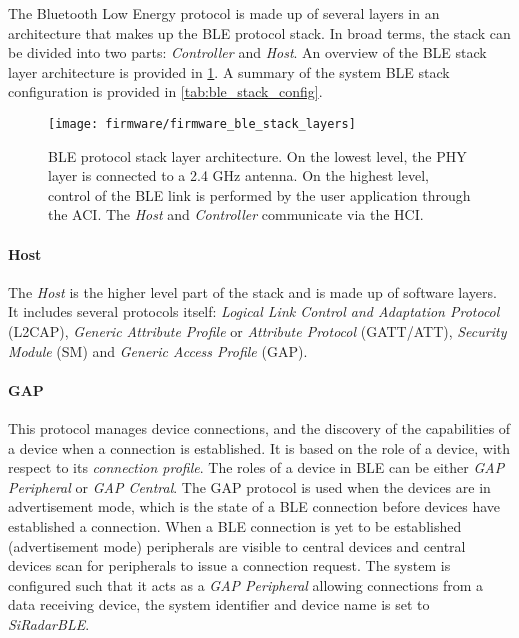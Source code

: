 The Bluetooth Low Energy protocol is made up of several layers in an architecture that makes up the BLE protocol stack. In broad terms, the stack can be divided into two parts: \textit{Controller} and \textit{Host}. An overview of the BLE stack layer architecture is provided in \cref{fig:firmware_ble_stack_layers}. A summary of the system BLE stack configuration is provided in \cref{tab:ble_stack_config}.

\begin{figure}[ht]
	\centering
	\texttt{[image: firmware/firmware\_ble\_stack\_layers]}
	\caption{BLE protocol stack layer architecture. On the lowest level, the PHY layer is connected to a 2.4 GHz antenna. On the highest level, control of the BLE link is performed by the user application through the ACI. The \textit{Host} and \textit{Controller} communicate via the HCI.}
	\label{fig:firmware_ble_stack_layers}
\end{figure}

\paragraph{Host}

The \textit{Host} is the higher level part of the stack and is made up of software layers. It includes several protocols itself: \textit{Logical Link Control and Adaptation Protocol} (L2CAP), \textit{Generic Attribute Profile} or \textit{Attribute Protocol} (GATT/ATT), \textit{Security Module} (SM) and \textit{Generic Access Profile} (GAP).

\paragraph{GAP}
This protocol manages device connections, and the discovery of the capabilities of a device when a connection is established. It is based on the role of a device, with respect to its \textit{connection profile}. The roles of a device in BLE can be either \textit{GAP Peripheral} or \textit{GAP Central}. The GAP protocol is used when the devices are in advertisement mode, which is the state of a BLE connection before devices have established a connection. When a BLE connection is yet to be established (advertisement mode) peripherals are visible to central devices and central devices scan for peripherals to issue a connection request. The system is configured such that it acts as a \textit{GAP Peripheral} allowing connections from a data receiving device, the system identifier and device name is set to \textit{SiRadarBLE}.


